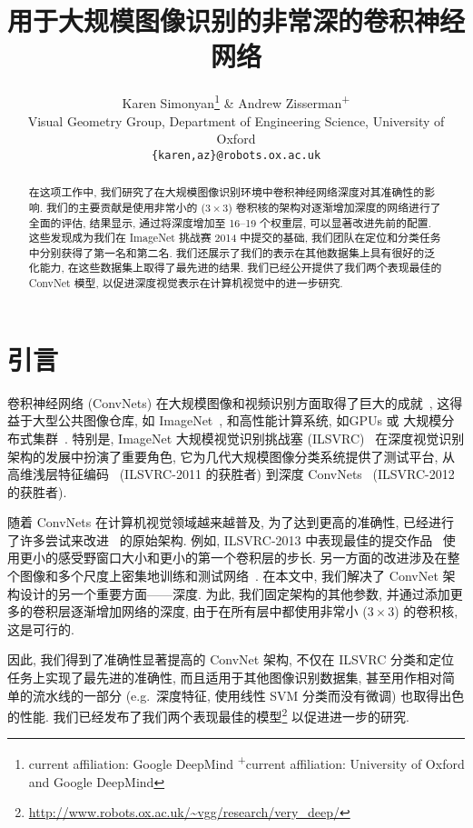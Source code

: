 \documentclass{article} %
\title{用于大规模图像识别的非常深的卷积神经网络}
\author{
Karen Simonyan\thanks{current affiliation: Google DeepMind \; \textsuperscript{+}current affiliation: University of Oxford and Google DeepMind} \;
\& Andrew Zisserman\textsuperscript{+} \\
Visual Geometry Group, Department of Engineering Science, University of Oxford\\
\texttt{\{karen,az\}@robots.ox.ac.uk}  
}
\makeatletter
\newcommand*{\eg}{e.g.\@\xspace}
\makeatother
\begin{document}
\maketitle

\begin{abstract}
在这项工作中, 我们研究了在大规模图像识别环境中卷积神经网络深度对其准确性的影响.
我们的主要贡献是使用非常小的 ($3 \times 3$) 卷积核的架构对逐渐增加深度的网络进行了全面的评估, 
结果显示, 通过将深度增加至 16--19 个权重层, 可以显著改进先前的配置.
这些发现成为我们在 \mbox{ImageNet} \mbox{挑战赛} 2014 中提交的基础, 我们团队在定位和分类任务中分别获得了第一名和第二名.
我们还展示了我们的表示在其他数据集上具有很好的泛化能力, 在这些数据集上取得了最先进的结果.
我们已经公开提供了我们两个表现最佳的 ConvNet 模型, 以促进深度视觉表示在计算机视觉中的进一步研究.
\end{abstract}

\section{引言}
卷积神经网络 (ConvNets) 在大规模图像和视频识别方面取得了巨大的成就~\citep{Krizhevsky12,Zeiler13,Sermanet14,Simonyan14b}, 这得益于大型公共图像仓库, 如 ImageNet~\citep{Deng09},
和高性能计算系统, 如GPUs 或 大规模分布式集群~\citep{Dean12}.
特别是, ImageNet 大规模视觉识别挑战塞 (ILSVRC)~\citep{Russakovsky14} 在深度视觉识别架构的发展中扮演了重要角色,
它为几代大规模图像分类系统提供了测试平台, 从高维浅层特征编码~\citep{Perronnin10a} (ILSVRC-2011 的获胜者) 到深度 ConvNets~\citep{Krizhevsky12} (ILSVRC-2012 的获胜者).

随着 ConvNets 在计算机视觉领域越来越普及, 为了达到更高的准确性, 已经进行了许多尝试来改进~\citet{Krizhevsky12} 的原始架构. 例如, ILSVRC-2013 中表现最佳的提交作品~\citep{Zeiler13,Sermanet14} 使用更小的感受野窗口大小和更小的第一个卷积层的步长. 另一方面的改进涉及在整个图像和多个尺度上密集地训练和测试网络~\citep{Sermanet14,Howard14}.
在本文中, 我们解决了 ConvNet 架构设计的另一个重要方面——深度. 为此, 我们固定架构的其他参数, 并通过添加更多的卷积层逐渐增加网络的深度, 由于在所有层中都使用非常小 ($3\times 3$) 的卷积核, 这是可行的.

因此, 我们得到了准确性显著提高的 ConvNet 架构, 不仅在 ILSVRC 分类和定位任务上实现了最先进的准确性, 而且适用于其他图像识别数据集, 甚至用作相对简单的流水线的一部分 (\eg~深度特征, 使用线性 SVM 分类而没有微调) 也取得出色的性能.
我们已经发布了我们两个表现最佳的模型\footnote{\url{http://www.robots.ox.ac.uk/~vgg/research/very_deep/}} 以促进进一步的研究.
\end{document}
